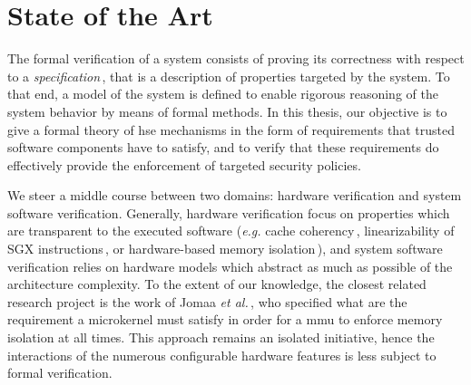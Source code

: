 \chapter{State of the Art}
\label{chapter:relatedwork}


%

\vspace{1cm}%
\noindent
%
The formal verification of a system consists of proving its correctness with
respect to a \emph{specification}\,\cite{gupta1992formal}, that is a description
of properties targeted by the system.
%
To that end, a model of the system is defined to enable rigorous reasoning of
the system behavior by means of formal methods.
%
%
In this thesis, our objective is to give a formal theory of \ac{hse}
mechanisms in the form of requirements that trusted software components have to
satisfy, and to verify that these requirements do effectively provide the
enforcement of targeted security policies.

We steer a middle course between two domains: hardware verification and system
software verification.
%
Generally, hardware verification focus on properties which are transparent to
the executed software (\emph{e.g.} cache
coherency\,\cite{stern1995cachecoherence}, linearizability of SGX
instructions\,\cite{leslie2015linsgx}, or hardware-based memory
isolation\,\cite{lie2003xom}), and system software verification relies on
hardware models which abstract as much as possible of the architecture
complexity.
%
To the extent of our knowledge, the closest related research project  is the work
of Jomaa \emph{et al.}\,\cite{jomaa2016mmu}, who specified what are the
requirement a microkernel must satisfy in order for a \ac{mmu} to enforce memory
isolation at all times.
%
This approach remains an isolated initiative, hence the interactions of the
numerous configurable hardware features is less subject to formal verification.

